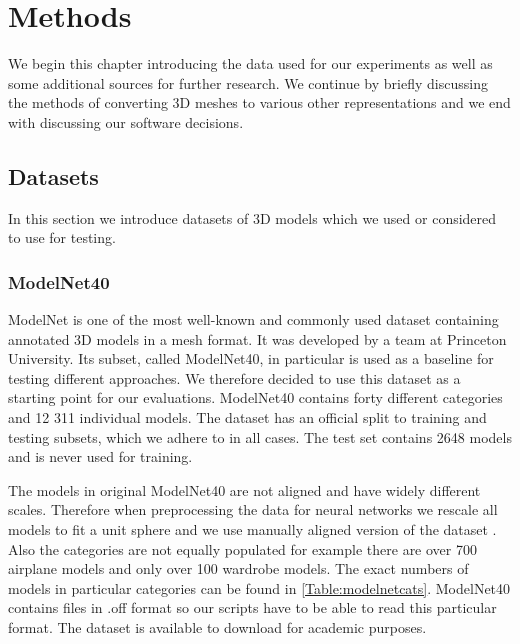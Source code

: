 \chapter{Methods}
\label{sec:chap4}
We begin this chapter introducing the data used for our experiments as well as some additional sources for further research. We continue by briefly discussing the methods of converting 3D meshes to various other representations and we end with discussing our software decisions.

\section{Datasets}
In this section we introduce datasets of 3D models which we used or considered to use for testing.

\subsection{ModelNet40}
ModelNet \cite{wu_3d_2014} is one of the most well-known and commonly used dataset containing annotated 3D models in a mesh format. It was developed by a team at Princeton University. Its subset, called ModelNet40, in particular is used as a baseline for testing different approaches. We therefore decided to use this dataset as a starting point for our evaluations. ModelNet40 contains forty different categories and 12 311 individual models. The dataset has an official split to training and testing subsets, which we adhere to in all cases. The test set contains 2648 models and is never used for training. \par
The models in original ModelNet40 are not aligned and have widely different scales. Therefore when preprocessing the data for neural networks we rescale all models to fit a  unit sphere and we use manually aligned version of the dataset \cite{sedaghat_orientation-boosted_2016}. Also the categories are not equally populated for example there are over 700 airplane models and only over 100 wardrobe models. The exact numbers of models in particular categories can be found in \autoref{Table:modelnetcats}. ModelNet40 contains files in .off format so our scripts have to be able to read this particular format. The dataset is available to download for academic purposes.



